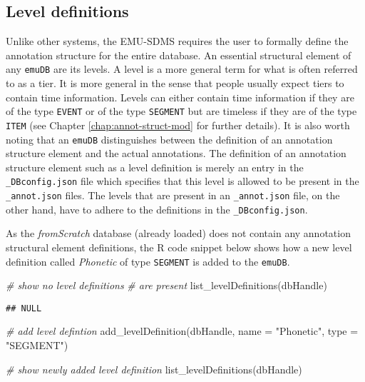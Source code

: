 \documentclass[
]{book}
\newenvironment{Shaded}{\begin{snugshade}}{\end{snugshade}}
\newcommand{\AttributeTok}[1]{\textcolor[rgb]{0.77,0.63,0.00}{#1}}
\newcommand{\CommentTok}[1]{\textcolor[rgb]{0.56,0.35,0.01}{\textit{#1}}}
\newcommand{\FunctionTok}[1]{\textcolor[rgb]{0.00,0.00,0.00}{#1}}
\newcommand{\NormalTok}[1]{#1}
\newcommand{\StringTok}[1]{\textcolor[rgb]{0.31,0.60,0.02}{#1}}
\begin{document}
\hypertarget{level-definitions}{%
\subsection{Level definitions}\label{level-definitions}}

Unlike other systems, the EMU-SDMS requires the user to formally define the annotation structure for the entire database. An essential structural element of any \texttt{emuDB} are its levels. A level is a more general term for what is often referred to as a tier. It is more general in the sense that people usually expect tiers to contain time information. Levels can either contain time information if they are of the type \texttt{EVENT} or of the type \texttt{SEGMENT} but are timeless if they are of the type \texttt{ITEM} (see Chapter \ref{chap:annot-struct-mod} for further details). It is also worth noting that an \texttt{emuDB} distinguishes between the definition of an annotation structure element and the actual annotations. The definition of an annotation structure element such as a level definition is merely an entry in the \texttt{\_DBconfig.json} file which specifies that this level is allowed to be present in the \texttt{\_annot.json} files. The levels that are present in an \texttt{\_annot.json} file, on the other hand, have to adhere to the definitions in the \texttt{\_DBconfig.json}.

As the \emph{fromScratch} database (already loaded) does not contain any annotation structural element definitions, the R code snippet below shows how a new level definition called \emph{Phonetic} of type \texttt{SEGMENT} is added to the \texttt{emuDB}.

\begin{Shaded}
\begin{Highlighting}[]
\CommentTok{\# show no level definitions}
\CommentTok{\# are present}
\FunctionTok{list\_levelDefinitions}\NormalTok{(dbHandle)}
\end{Highlighting}
\end{Shaded}

\begin{verbatim}
## NULL
\end{verbatim}

\begin{Shaded}
\begin{Highlighting}[]
\CommentTok{\# add level defintion}
\FunctionTok{add\_levelDefinition}\NormalTok{(dbHandle,}
                    \AttributeTok{name =} \StringTok{"Phonetic"}\NormalTok{,}
                    \AttributeTok{type =} \StringTok{"SEGMENT"}\NormalTok{)}

\CommentTok{\# show newly added level definition}
\FunctionTok{list\_levelDefinitions}\NormalTok{(dbHandle)}
\end{Highlighting}
\end{Shaded}
\end{document}
